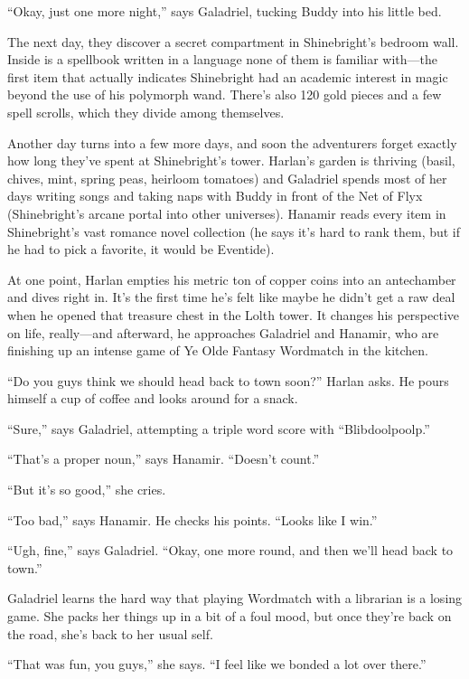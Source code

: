 \documentclass[smalldemyvopaper,11pt,twoside,onecolumn,openright,extrafontsizes]{memoir}
\begin{document}
``Okay, just one more night,'' says Galadriel, tucking Buddy into his
little bed.

The next day, they discover a secret compartment in Shinebright's
bedroom wall. Inside is a spellbook written in a language none of them
is familiar with---the first item that actually indicates Shinebright
had an academic interest in magic beyond the use of his polymorph wand.
There's also 120 gold pieces and a few spell scrolls, which they divide
among themselves.

Another day turns into a few more days, and soon the adventurers forget
exactly how long they've spent at Shinebright's tower. Harlan's garden
is thriving (basil, chives, mint, spring peas, heirloom tomatoes) and
Galadriel spends most of her days writing songs and taking naps with
Buddy in front of the Net of Flyx (Shinebright's arcane portal into
other universes). Hanamir reads every item in Shinebright's vast romance
novel collection (he says it's hard to rank them, but if he had to pick
a favorite, it would be Eventide).

At one point, Harlan empties his metric ton of copper coins into an
antechamber and dives right in. It's the first time he's felt like maybe
he didn't get a raw deal when he opened that treasure chest in the Lolth
tower. It changes his perspective on life, really---and afterward, he
approaches Galadriel and Hanamir, who are finishing up an intense game
of Ye Olde Fantasy Wordmatch in the kitchen.

``Do you guys think we should head back to town soon?'' Harlan asks. He
pours himself a cup of coffee and looks around for a snack.

``Sure,'' says Galadriel, attempting a triple word score with
``Blibdoolpoolp.''

``That's a proper noun,'' says Hanamir. ``Doesn't count.''

``But it's so good,'' she cries.

``Too bad,'' says Hanamir. He checks his points. ``Looks like I win.''

``Ugh, fine,'' says Galadriel. ``Okay, one more round, and then we'll
head back to town.''

Galadriel learns the hard way that playing Wordmatch with a librarian is
a losing game. She packs her things up in a bit of a foul mood, but once
they're back on the road, she's back to her usual self.

``That was fun, you guys,'' she says. ``I feel like we bonded a lot over
there.''
\end{document}
